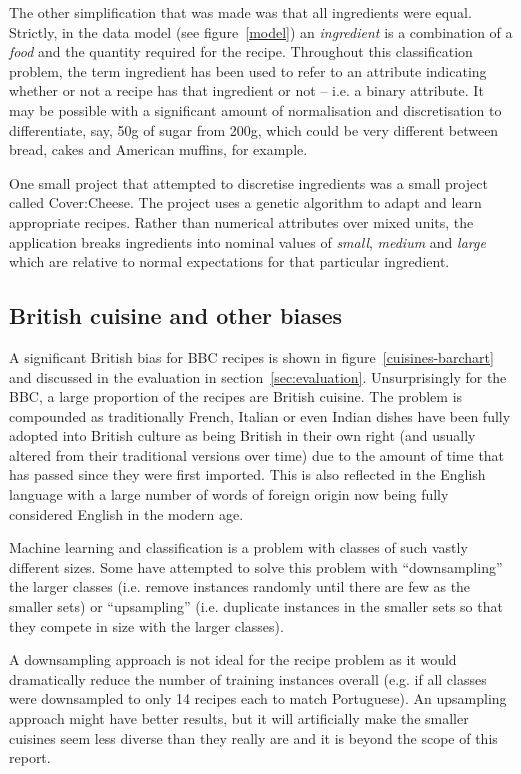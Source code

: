 \documentclass[11pt,a4paper]{article}
\begin{document}
The other simplification that was made was that all ingredients were equal. Strictly,
in the data model (see figure~\ref{model}) an \emph{ingredient} is a combination of a
\emph{food} and the quantity required for the recipe. Throughout this classification
problem, the term ingredient has been used to refer to an attribute indicating
whether or not a recipe has that ingredient or not -- i.e. a binary attribute. It may
be possible with a significant amount of normalisation and discretisation to
differentiate, say, 50g of sugar from 200g, which could be very different between
bread, cakes and American muffins, for example.

One small project that attempted to discretise ingredients was a small project
called Cover:Cheese. \cite{covercheese} The project uses a genetic algorithm
to adapt and learn appropriate recipes. Rather than numerical attributes over
mixed units, the application breaks ingredients into nominal values of \emph{small},
\emph{medium} and \emph{large} which are relative to normal expectations for
that particular ingredient.

\subsection{British cuisine and other biases}
\label{sec:british-bias}

A significant British bias for BBC recipes is shown in figure~\ref{cuisines-barchart}
and discussed in the evaluation in section~\ref{sec:evaluation}. Unsurprisingly
for the BBC, a large proportion of the recipes are British cuisine. The problem
is compounded as traditionally French, Italian or even Indian dishes have been
fully adopted into British culture as being British in their own right (and
usually altered from their traditional versions over time) due to the
amount of time that has passed since they were first imported. This is also
reflected in the English language with a large number of words of foreign origin
now being fully considered English in the modern age.

Machine learning and classification is a problem with classes of such vastly
different sizes. \cite{provost2000machine} Some have attempted to solve this
problem with ``downsampling'' the larger classes (i.e. remove instances
randomly until there are few as the smaller sets) or ``upsampling'' (i.e.
duplicate instances in the smaller sets so that they compete in size with
the larger classes). \cite{provost2000machine}

A downsampling approach is not ideal for the recipe problem as it would
dramatically reduce the number of training instances overall (e.g. if
all classes were downsampled to only 14 recipes each to match Portuguese). An
upsampling approach might have better results, but it will artificially
make the smaller cuisines seem less diverse than they really are and it
is beyond the scope of this report.
\end{document}
